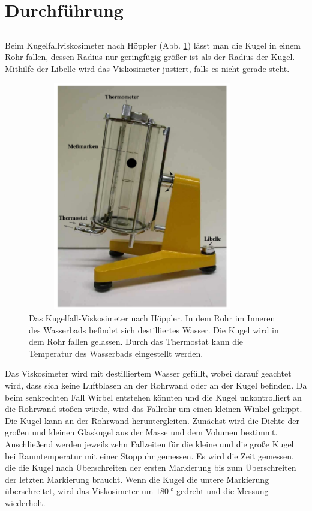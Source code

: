 \section{Durchführung}
\label{sec:Durchführung}

\subsection{}
Beim Kugelfallviskosimeter nach Höppler (Abb. \ref{fig:viskosimeter}) lässt man die Kugel in einem Rohr fallen, 
dessen Radius nur geringfügig größer ist als der Radius der Kugel.
Mithilfe der Libelle wird das Viskosimeter justiert, falls es nicht gerade steht.
\begin{figure}
    \centering
    \includegraphics[width=10cm, height=10cm]{build/viskosimeter.png}
    \caption{Das Kugelfall-Viskosimeter nach Höppler.
    In dem Rohr im Inneren des Wasserbads befindet sich destilliertes Wasser.
    Die Kugel wird in dem Rohr fallen gelassen. Durch das Thermostat kann die 
    Temperatur des Wasserbads eingestellt werden.}
    \label{fig:viskosimeter}
\end{figure}
\noindent Das Viskosimeter wird mit destilliertem Wasser gefüllt, wobei darauf geachtet wird, 
dass sich keine Luftblasen an der Rohrwand oder an der Kugel befinden. 
Da beim senkrechten Fall Wirbel entstehen könnten und die Kugel unkontrolliert an die 
Rohrwand stoßen würde, wird das Fallrohr um einen kleinen Winkel gekippt.
Die Kugel kann an der Rohrwand heruntergleiten.
\newline
Zunächst wird die Dichte der großen und kleinen Glaskugel aus der Masse und dem Volumen bestimmt.  
Anschließend werden jeweils zehn Fallzeiten für die kleine und die große Kugel bei Raumtemperatur 
mit einer Stoppuhr gemessen. Es wird die Zeit gemessen, die die Kugel nach Überschreiten der ersten Markierung
bis zum Überschreiten der letzten Markierung braucht.
Wenn die Kugel die untere Markierung überschreitet, 
wird das Viskosimeter um $\SI{180}{\degree}$ gedreht und die Messung wiederholt.  

